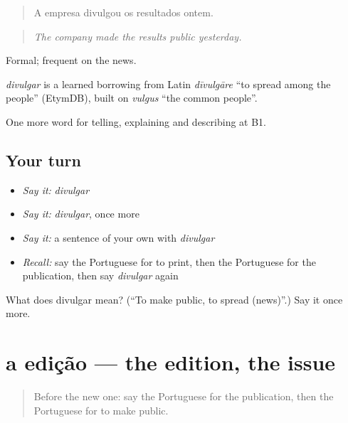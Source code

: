 \begin{quote}
A empresa divulgou os resultados ontem.
\end{quote}

\begin{quote}
\emph{The company made the results public yesterday.}
\end{quote}

Formal; frequent on the news.

\begin{cousinweb}
\emph{divulgar} is a learned borrowing from Latin \emph{dīvulgāre} \textquotedblleft{}to spread among the people\textquotedblright{} (EtymDB), built on \emph{vulgus} \textquotedblleft{}the common people\textquotedblright{}.
\end{cousinweb}

\begin{grammarlens}[title={What you've built}]
One more word for telling, explaining and describing at B1.
\end{grammarlens}

\subsection*{Your turn}
\begin{itemize}
\raggedright
  \item \emph{Say it:} \emph{divulgar}
  \item \emph{Say it:} \emph{divulgar}, once more
  \item \emph{Say it:} a sentence of your own with \emph{divulgar}
  \item \emph{Recall:} say the Portuguese for to print, then the Portuguese for the publication, then say \emph{divulgar} again
\end{itemize}

\begin{tcolorbox}[breakable,colback=teal!4,colframe=teal!35!black,title={Before you move on}]
What does divulgar mean? (\textquotedblleft{}To make public, to spread (news)\textquotedblright{}.) Say it once more.
\end{tcolorbox}
\section[a edição]{a edição — the edition, the issue}

\label{lesson:PT-C280-edicao}



\begin{quote}
Before the new one: say the Portuguese for the publication, then the Portuguese for to make public.
\end{quote}

